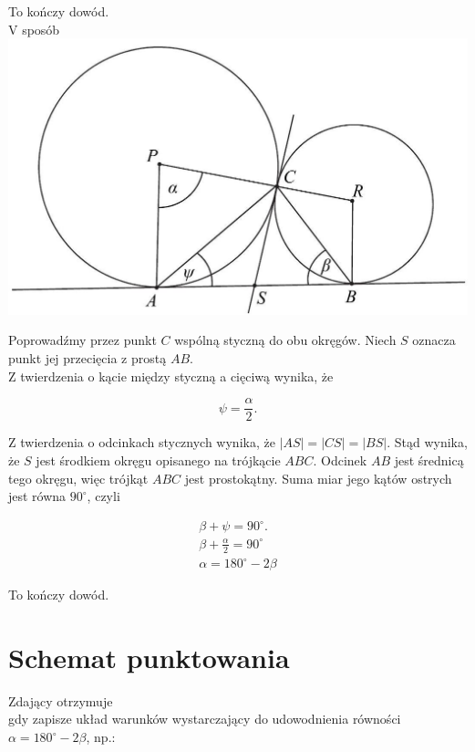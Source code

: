 \documentclass[10pt]{article}
\begin{document}
To kończy dowód.\\
V sposób\\
\includegraphics[max width=\textwidth, center]{2025_02_07_e35f706dbfcfb4be75cfg-11}

Poprowadźmy przez punkt $C$ wspólną styczną do obu okręgów. Niech $S$ oznacza punkt jej przecięcia z prostą $A B$.\\
Z twierdzenia o kącie między styczną a cięciwą wynika, że

$$
\psi=\frac{\alpha}{2} .
$$

Z twierdzenia o odcinkach stycznych wynika, że $|A S|=|C S|=|B S|$. Stąd wynika, że $S$ jest środkiem okręgu opisanego na trójkącie $A B C$. Odcinek $A B$ jest średnicą tego okręgu, więc trójkąt $A B C$ jest prostokątny. Suma miar jego kątów ostrych jest równa $90^{\circ}$, czyli

$$
\begin{gathered}
\beta+\psi=90^{\circ} . \\
\beta+\frac{\alpha}{2}=90^{\circ} \\
\alpha=180^{\circ}-2 \beta
\end{gathered}
$$

To kończy dowód.

\section*{Schemat punktowania}
Zdający otrzymuje\\
gdy zapisze układ warunków wystarczający do udowodnienia równości $\alpha=180^{\circ}-2 \beta$, np.:
\end{document}
